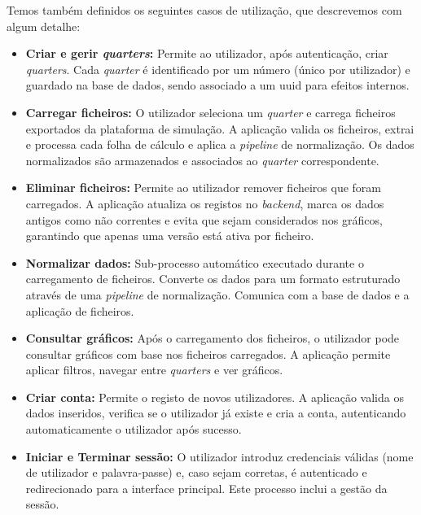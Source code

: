 Temos também definidos os seguintes casos de utilização, que descrevemos com algum detalhe:
\begin{itemize}
    \item \textbf{Criar e gerir \textit{quarters}:} Permite ao utilizador, após autenticação, criar \textit{quarters}. Cada \textit{quarter} é identificado por um número (único por utilizador) e guardado na base de dados, sendo associado a um \gls{uuid} para efeitos internos.

    \item \textbf{Carregar ficheiros:} O utilizador seleciona um \textit{quarter} e carrega ficheiros exportados da plataforma de simulação. A aplicação valida os ficheiros, extrai e processa cada folha de cálculo e aplica a \textit{pipeline} de normalização. Os dados normalizados são armazenados e associados ao \textit{quarter} correspondente.

    \item \textbf{Eliminar ficheiros:} Permite ao utilizador remover ficheiros que foram carregados. A aplicação atualiza os registos no \textit{backend}, marca os dados antigos como não correntes e evita que sejam considerados nos gráficos, garantindo que apenas uma versão está ativa por ficheiro.

    \item \textbf{Normalizar dados:} Sub-processo automático executado durante o carregamento de ficheiros. Converte os dados para um formato estruturado através de uma \textit{pipeline} de normalização. Comunica com a base de dados e a aplicação de ficheiros.

    \item \textbf{Consultar gráficos:} Após o carregamento dos ficheiros, o utilizador pode consultar gráficos com base nos ficheiros carregados. A aplicação permite aplicar filtros, navegar entre \textit{quarters} e ver gráficos.

    \item \textbf{Criar conta:} Permite o registo de novos utilizadores. A aplicação valida os dados inseridos, verifica se o utilizador já existe e cria a conta, autenticando automaticamente o utilizador após sucesso.

    \item \textbf{Iniciar e Terminar sessão:} O utilizador introduz credenciais válidas (nome de utilizador e palavra-passe) e, caso sejam corretas, é autenticado e redirecionado para a interface principal. Este processo inclui a gestão da sessão.

\end{itemize}

